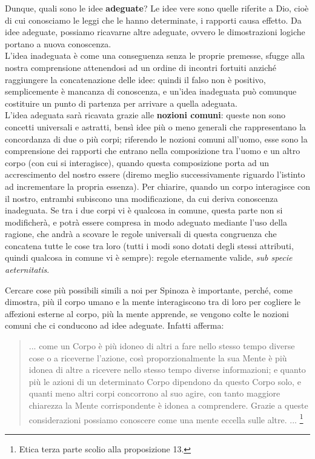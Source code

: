 Dunque, quali sono le idee \textbf{adeguate}? Le idee vere sono quelle riferite a Dio, cioè di cui conosciamo le leggi che le hanno determinate, i rapporti causa effetto. Da idee adeguate, possiamo ricavarne altre adeguate, ovvero le dimostrazioni logiche portano a nuova conoscenza.\\L'idea inadeguata è come una conseguenza senza le proprie premesse, sfugge alla nostra comprensione attenendosi ad un ordine di incontri fortuiti anziché raggiungere la concatenazione delle idee: quindi il falso non è positivo, semplicemente è mancanza di conoscenza, e un'idea inadeguata può comunque costituire un punto di partenza per arrivare a quella adeguata.\\
L'idea adeguata sarà ricavata grazie alle \textbf{nozioni comuni}: queste non sono concetti universali e astratti, bensì idee più o meno generali che rappresentano la concordanza di due o più corpi; riferendo le nozioni comuni all'uomo, esse sono la comprensione dei rapporti che entrano nella composizione tra l'uomo e un altro corpo (con cui si interagisce), quando questa composizione porta ad un accrescimento del nostro essere (diremo meglio successivamente riguardo l'istinto ad incrementare la propria essenza). Per chiarire, quando un corpo interagisce con il nostro, entrambi subiscono una modificazione, da cui deriva conoscenza inadeguata. Se tra i due corpi vi è qualcosa in comune, questa parte non si modificherà, e potrà essere compresa in modo adeguato mediante l'uso della ragione, che andrà a scovare le regole universali di questa congruenza che concatena tutte le cose tra loro (tutti i modi sono dotati degli stessi attributi, quindi qualcosa in comune vi è sempre): regole eternamente valide, \textit{sub specie aeternitatis}.

Cercare cose più possibili simili a noi per Spinoza è importante, perché, come dimostra, più il corpo umano e la mente interagiscono tra di loro per cogliere le affezioni esterne al corpo, più la mente apprende, se vengono colte le nozioni comuni che ci conducono ad idee adeguate. Infatti afferma:

\begin{quotation}
	\small ... come un Corpo è più idoneo di altri a fare nello stesso tempo diverse cose o a riceverne l’azione, così proporzionalmente la sua Mente è più idonea di altre a ricevere nello stesso tempo diverse informazioni; e quanto più le azioni di un determinato Corpo dipendono da questo Corpo
	solo, e quanti meno altri corpi concorrono al suo agire, con tanto maggiore chiarezza la
	Mente corrispondente è idonea a comprendere. Grazie a queste considerazioni possiamo
	conoscere come una mente eccella sulle altre. ... \footnote{Etica terza parte scolio alla proposizione 13.}
\end{quotation}

